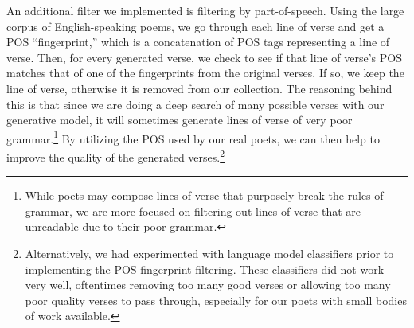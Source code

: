 \documentclass[11pt]{article}
\begin{document}
An additional filter we implemented is filtering by part-of-speech.
Using the large corpus of English-speaking poems, we go through each line of verse and get a POS ``fingerprint,'' which is a concatenation of POS tags representing a line of verse.
Then, for every generated verse, we check to see if that line of verse's POS matches that of one of the fingerprints from the original verses.
If so, we keep the line of verse, otherwise it is removed from our collection.
The reasoning behind this is that since we are doing a deep search of many possible verses with our generative model, it will sometimes generate lines of verse of very poor grammar.\footnote{While poets may compose lines of verse that purposely break the rules of grammar, we are more focused on filtering out lines of verse that are unreadable due to their poor grammar.}
By utilizing the POS used by our real poets, we can then help to improve the quality of the generated verses.\footnote{Alternatively, we had experimented with language model classifiers prior to implementing the POS fingerprint filtering. These classifiers did not work very well, oftentimes removing too many good verses or allowing too many poor quality verses to pass through, especially for our poets with small bodies of work available.} %



\end{document}
